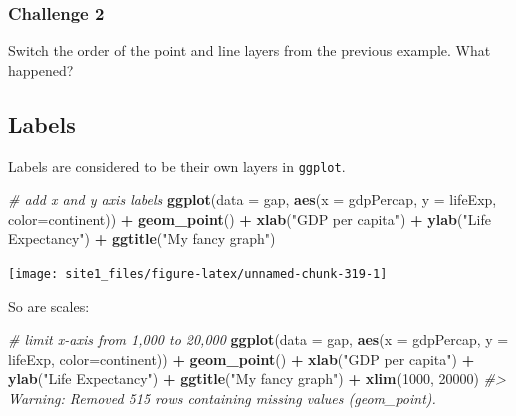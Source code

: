 \documentclass[]{book}
\newenvironment{Shaded}{\begin{snugshade}}{\end{snugshade}}
\newcommand{\KeywordTok}[1]{\textcolor[rgb]{0.13,0.29,0.53}{\textbf{#1}}}
\newcommand{\DataTypeTok}[1]{\textcolor[rgb]{0.13,0.29,0.53}{#1}}
\newcommand{\DecValTok}[1]{\textcolor[rgb]{0.00,0.00,0.81}{#1}}
\newcommand{\StringTok}[1]{\textcolor[rgb]{0.31,0.60,0.02}{#1}}
\newcommand{\CommentTok}[1]{\textcolor[rgb]{0.56,0.35,0.01}{\textit{#1}}}
\newcommand{\OperatorTok}[1]{\textcolor[rgb]{0.81,0.36,0.00}{\textbf{#1}}}
\newcommand{\NormalTok}[1]{#1}
\begin{document}
\subsubsection*{Challenge 2}\label{challenge-2-1}

Switch the order of the point and line layers from the previous example.
What happened?

\subsection{Labels}\label{labels-1}

Labels are considered to be their own layers in \texttt{ggplot}.

\begin{Shaded}
\begin{Highlighting}[]
\CommentTok{# add x and y axis labels}
\KeywordTok{ggplot}\NormalTok{(}\DataTypeTok{data =}\NormalTok{ gap, }\KeywordTok{aes}\NormalTok{(}\DataTypeTok{x =}\NormalTok{ gdpPercap, }\DataTypeTok{y =}\NormalTok{ lifeExp, }\DataTypeTok{color=}\NormalTok{continent)) }\OperatorTok{+}\StringTok{ }
\StringTok{  }\KeywordTok{geom_point}\NormalTok{() }\OperatorTok{+}\StringTok{ }
\StringTok{  }\KeywordTok{xlab}\NormalTok{(}\StringTok{"GDP per capita"}\NormalTok{) }\OperatorTok{+}\StringTok{ }
\StringTok{  }\KeywordTok{ylab}\NormalTok{(}\StringTok{"Life Expectancy"}\NormalTok{) }\OperatorTok{+}\StringTok{ }
\StringTok{  }\KeywordTok{ggtitle}\NormalTok{(}\StringTok{"My fancy graph"}\NormalTok{)}
\end{Highlighting}
\end{Shaded}

\begin{center}\texttt{[image: site1\_files/figure-latex/unnamed-chunk-319-1]} \end{center}

So are scales:

\begin{Shaded}
\begin{Highlighting}[]
\CommentTok{# limit x-axis from 1,000 to 20,000}
\KeywordTok{ggplot}\NormalTok{(}\DataTypeTok{data =}\NormalTok{ gap, }\KeywordTok{aes}\NormalTok{(}\DataTypeTok{x =}\NormalTok{ gdpPercap, }\DataTypeTok{y =}\NormalTok{ lifeExp, }\DataTypeTok{color=}\NormalTok{continent)) }\OperatorTok{+}\StringTok{ }
\StringTok{  }\KeywordTok{geom_point}\NormalTok{() }\OperatorTok{+}\StringTok{ }
\StringTok{  }\KeywordTok{xlab}\NormalTok{(}\StringTok{"GDP per capita"}\NormalTok{) }\OperatorTok{+}\StringTok{ }
\StringTok{  }\KeywordTok{ylab}\NormalTok{(}\StringTok{"Life Expectancy"}\NormalTok{) }\OperatorTok{+}\StringTok{ }
\StringTok{  }\KeywordTok{ggtitle}\NormalTok{(}\StringTok{"My fancy graph"}\NormalTok{) }\OperatorTok{+}\StringTok{ }
\StringTok{  }\KeywordTok{xlim}\NormalTok{(}\DecValTok{1000}\NormalTok{, }\DecValTok{20000}\NormalTok{)}
\CommentTok{#> Warning: Removed 515 rows containing missing values (geom_point).}
\end{Highlighting}
\end{Shaded}
\end{document}
